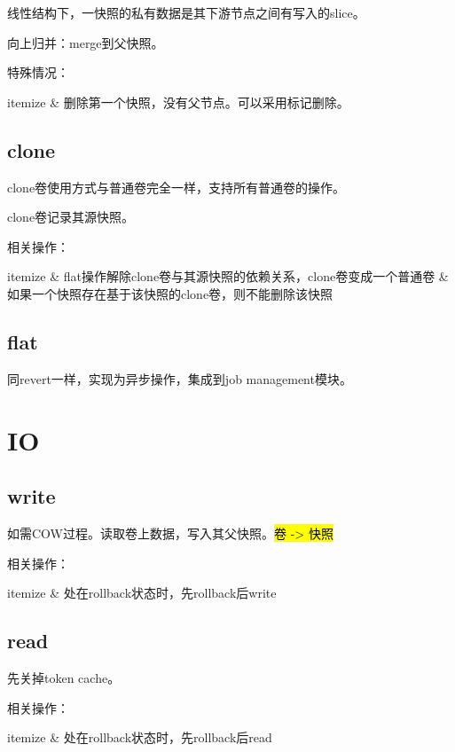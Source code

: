 线性结构下，一快照的私有数据是其下游节点之间有写入的slice。

向上归并：merge到父快照。

特殊情况：
\begin{myeasylist}{itemize}
    & 删除第一个快照，没有父节点。可以采用标记删除。
\end{myeasylist}

\subsection{clone}

clone卷使用方式与普通卷完全一样，支持所有普通卷的操作。

clone卷记录其源快照。

相关操作：
\begin{myeasylist}{itemize}
    & flat操作解除clone卷与其源快照的依赖关系，clone卷变成一个普通卷
    & 如果一个快照存在基于该快照的clone卷，则不能删除该快照
\end{myeasylist}

\subsection{flat}

同revert一样，实现为异步操作，集成到job management模块。

\section{IO}

\subsection{write}

如需COW过程。读取卷上数据，写入其父快照。\hl{卷 -> 快照}

相关操作：
\begin{myeasylist}{itemize}
    & 处在rollback状态时，先rollback后write
\end{myeasylist}

\subsection{read}

先关掉token cache。

相关操作：
\begin{myeasylist}{itemize}
    & 处在rollback状态时，先rollback后read
\end{myeasylist}
